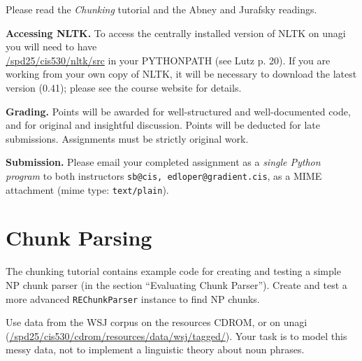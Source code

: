 \documentclass{cis530}
\begin{document}
\maketitle

Please read the \emph{Chunking} tutorial and the Abney and
Jurafsky readings.

{\bf Accessing NLTK.}  
To access the centrally installed version of NLTK on unagi you will
need to have\\ \url{/spd25/cis530/nltk/src} in your PYTHONPATH (see
Lutz p. 20).  If you are working from your own copy of NLTK, it will
be necessary to download the latest version (0.41); please see the
course website for details.

{\bf Grading.}
Points will be awarded for well-structured and well-documented code,
and for original and insightful discussion.
Points will be deducted for late submissions.  Assignments must be
strictly original work.

{\bf Submission.}  
Please email your completed assignment as a
\emph{single Python program} to both instructors
\texttt{sb@cis, edloper@gradient.cis}, as a MIME attachment
(mime type: \texttt{text/plain}).
\vspace{2ex}


\section{Chunk Parsing}

  The chunking tutorial contains example code for creating and testing
  a simple NP chunk parser (in the section ``Evaluating Chunk
  Parser'').  Create and test a more advanced \texttt{REChunkParser}
  instance to find NP chunks.

  Use data from the WSJ corpus on the resources CDROM, or on
  unagi (\url{/spd25/cis530/cdrom/resources/data/wsj/tagged/}).
  Your task is to model this messy data, not to
  implement a linguistic theory about noun phrases.
\end{document}
